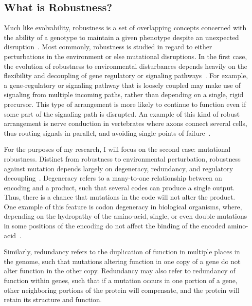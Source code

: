 \documentclass[PhD]{msu-thesis}
\begin{document}
\subsection{What is Robustness?}
Much like evolvability, robustness is a set of overlapping concepts concerned with the ability of a genotype to maintain a given phenotype despite an unexpected disruption~\cite{kitano_biological_2004,visser_perspective:_2003}. Most commonly, robustness is studied in regard to either perturbations in the environment or else mutational disruptions. In the first case, the evolution of robustness to environmental disturbances depends heavily on the flexibility and decoupling of gene regulatory or signaling pathways~\cite{kirschner_evolvability_1998}. For example, a gene-regulatory or signaling pathway that is loosely coupled may make use of signaling from multiple incoming paths, rather than depending on a single, rigid precursor. This type of arrangement is more likely to continue to function even if some part of the signaling path is disrupted. An example of this kind of robust arrangement is nerve conduction in vertebrates where axons connect several cells, thus routing signals in parallel, and avoiding single points of failure~\cite{kirschner_evolvability_1998}.

For the purposes of my research, I will focus on the second case: mutational robustness. Distinct from robustness to environmental perturbation, robustness against mutation depends largely on degeneracy, redundancy, and regulatory decoupling~\cite{kitano_biological_2004}. Degeneracy refers to a many-to-one relationship between an encoding and a product, such that several codes can produce a single output. Thus, there is a chance that mutations in the code will not alter the product. One example of this feature is codon degeneracy in biological organisms, where, depending on the hydropathy of the amino-acid, single, or even double mutations in some positions of the encoding do not affect the binding of the encoded amino-acid~\cite{whitacre_degeneracy:_2010}.

Similarly, redundancy refers to the duplication of function in multiple places in the genome, such that mutations altering function in one copy of a gene do not alter function in the other copy. Redundancy may also refer to redundancy of function within genes, such that if a mutation occurs in one portion of a gene, other neighboring portions of the protein will compensate, and the protein will retain its structure and function.\cite{wagner_distributed_2005} 
\end{document}
